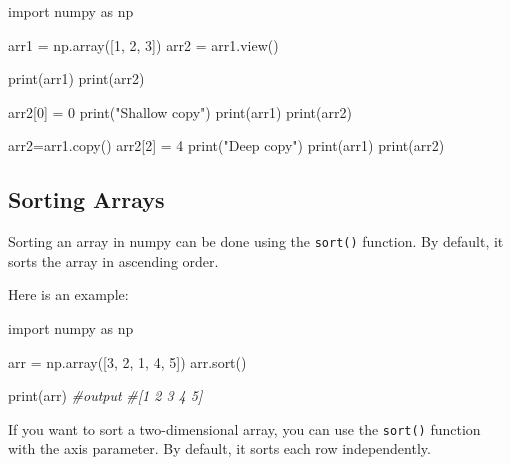 \documentclass[11pt]{article}
\newenvironment{Shaded}{}{}
\newcommand{\DecValTok}[1]{\textcolor[rgb]{0.25,0.63,0.44}{{#1}}}
\newcommand{\StringTok}[1]{\textcolor[rgb]{0.25,0.44,0.63}{{#1}}}
\newcommand{\CommentTok}[1]{\textcolor[rgb]{0.38,0.63,0.69}{\textit{{#1}}}}
\newcommand{\NormalTok}[1]{{#1}}
\newcommand{\ImportTok}[1]{{#1}}
\newcommand{\OperatorTok}[1]{\textcolor[rgb]{0.40,0.40,0.40}{{#1}}}
\newcommand{\BuiltInTok}[1]{{#1}}
\begin{document}
\begin{Shaded}
\begin{Highlighting}[]
\ImportTok{import}\NormalTok{ numpy }\ImportTok{as}\NormalTok{ np}

\NormalTok{arr1 }\OperatorTok{=}\NormalTok{ np.array([}\DecValTok{1}\NormalTok{, }\DecValTok{2}\NormalTok{, }\DecValTok{3}\NormalTok{])}
\NormalTok{arr2 }\OperatorTok{=}\NormalTok{ arr1.view()}

\BuiltInTok{print}\NormalTok{(arr1)}
\BuiltInTok{print}\NormalTok{(arr2)}

\NormalTok{arr2[}\DecValTok{0}\NormalTok{] }\OperatorTok{=} \DecValTok{0}
\BuiltInTok{print}\NormalTok{(}\StringTok{"Shallow copy"}\NormalTok{)}
\BuiltInTok{print}\NormalTok{(arr1)}
\BuiltInTok{print}\NormalTok{(arr2)}

\NormalTok{arr2}\OperatorTok{=}\NormalTok{arr1.copy()}
\NormalTok{arr2[}\DecValTok{2}\NormalTok{] }\OperatorTok{=} \DecValTok{4}
\BuiltInTok{print}\NormalTok{(}\StringTok{"Deep copy"}\NormalTok{)}
\BuiltInTok{print}\NormalTok{(arr1)}
\BuiltInTok{print}\NormalTok{(arr2)}
\end{Highlighting}
\end{Shaded}

\hypertarget{sorting-arrays}{%
\subsection{Sorting Arrays}\label{sorting-arrays}}

Sorting an array in numpy can be done using the \texttt{sort()}
function. By default, it sorts the array in ascending order.

Here is an example:

\begin{Shaded}
\begin{Highlighting}[]
\ImportTok{import}\NormalTok{ numpy }\ImportTok{as}\NormalTok{ np}

\NormalTok{arr }\OperatorTok{=}\NormalTok{ np.array([}\DecValTok{3}\NormalTok{, }\DecValTok{2}\NormalTok{, }\DecValTok{1}\NormalTok{, }\DecValTok{4}\NormalTok{, }\DecValTok{5}\NormalTok{])}
\NormalTok{arr.sort()}

\BuiltInTok{print}\NormalTok{(arr)}
\CommentTok{\#output}
\CommentTok{\#[1 2 3 4 5]}
\end{Highlighting}
\end{Shaded}

If you want to sort a two-dimensional array, you can use the
\texttt{sort()} function with the axis parameter. By default, it sorts
each row independently.
\end{document}
